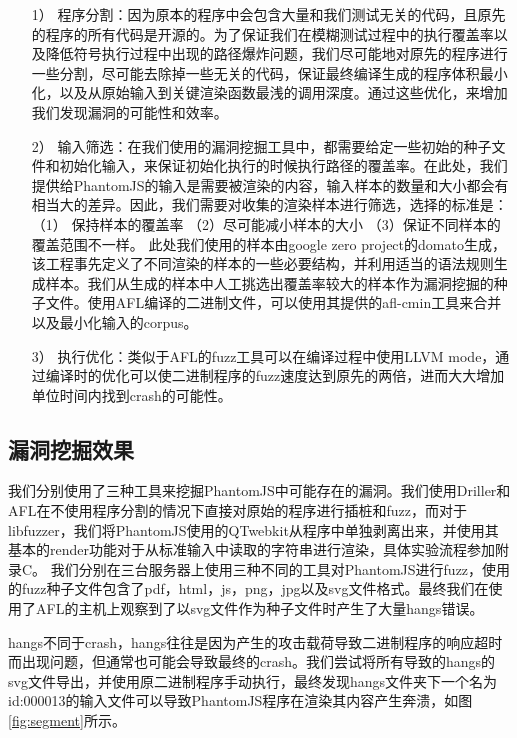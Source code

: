 \documentclass[doctor,privacy,twoside]{buaa_mac}
\begin{document}
\begin{itemize}
\item[1）] 程序分割：因为原本的程序中会包含大量和我们测试无关的代码，且原先的程序的所有代码是开源的。为了保证我们在模糊测试过程中的执行覆盖率以及降低符号执行过程中出现的路径爆炸问题，我们尽可能地对原先的程序进行一些分割，尽可能去除掉一些无关的代码，保证最终编译生成的程序体积最小化，以及从原始输入到关键渲染函数最浅的调用深度。通过这些优化，来增加我们发现漏洞的可能性和效率。

\item[2）] 输入筛选：在我们使用的漏洞挖掘工具中，都需要给定一些初始的种子文件和初始化输入，来保证初始化执行的时候执行路径的覆盖率。在此处，我们提供给PhantomJS的输入是需要被渲染的内容，输入样本的数量和大小都会有相当大的差异。因此，我们需要对收集的渲染样本进行筛选，选择的标准是：（1） 保持样本的覆盖率 （2）尽可能减小样本的大小 （3）保证不同样本的覆盖范围不一样。 此处我们使用的样本由google zero project的domato生成，该工程事先定义了不同渲染的样本的一些必要结构，并利用适当的语法规则生成样本。我们从生成的样本中人工挑选出覆盖率较大的样本作为漏洞挖掘的种子文件。使用AFL编译的二进制文件，可以使用其提供的afl-cmin工具来合并以及最小化输入的corpus。

\item[3）] 执行优化：类似于AFL的fuzz工具可以在编译过程中使用LLVM mode，通过编译时的优化可以使二进制程序的fuzz速度达到原先的两倍，进而大大增加单位时间内找到crash的可能性。
\end{itemize}

\subsection{漏洞挖掘效果}
我们分别使用了三种工具来挖掘PhantomJS中可能存在的漏洞。我们使用Driller和AFL在不使用程序分割的情况下直接对原始的程序进行插桩和fuzz，而对于libfuzzer，我们将PhantomJS使用的QTwebkit从程序中单独剥离出来，并使用其基本的render功能对于从标准输入中读取的字符串进行渲染，具体实验流程参加附录C。 我们分别在三台服务器上使用三种不同的工具对PhantomJS进行fuzz，使用的fuzz种子文件包含了pdf，html，js，png，jpg以及svg文件格式。最终我们在使用了AFL的主机上观察到了以svg文件作为种子文件时产生了大量hangs错误。

hangs不同于crash，hangs往往是因为产生的攻击载荷导致二进制程序的响应超时而出现问题，但通常也可能会导致最终的crash。我们尝试将所有导致的hangs的svg文件导出，并使用原二进制程序手动执行，最终发现hangs文件夹下一个名为 id:000013的输入文件可以导致PhantomJS程序在渲染其内容产生奔溃，如图\ref{fig:segment}所示。
\end{document}
